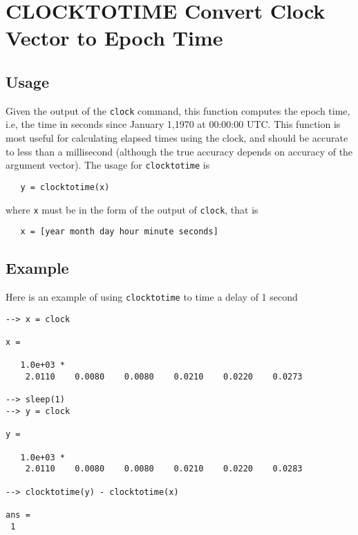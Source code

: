 \section{CLOCKTOTIME Convert Clock Vector to Epoch Time}

\subsection{Usage}

Given the output of the \verb|clock| command, this function computes
the epoch time, i.e, the time in seconds since January 1,1970 
at 00:00:00 UTC.  This function is most useful for calculating elapsed
times using the clock, and should be accurate to less than a millisecond
(although the true accuracy depends on accuracy of the argument vector). 
The usage for \verb|clocktotime| is
\begin{verbatim}
   y = clocktotime(x)
\end{verbatim}
where \verb|x| must be in the form of the output of \verb|clock|, that is
\begin{verbatim}
   x = [year month day hour minute seconds]
\end{verbatim}
\subsection{Example}

Here is an example of using \verb|clocktotime| to time a delay of 1 second
\begin{verbatim}
--> x = clock

x = 

   1.0e+03 * 
    2.0110    0.0080    0.0080    0.0210    0.0220    0.0273 

--> sleep(1)
--> y = clock

y = 

   1.0e+03 * 
    2.0110    0.0080    0.0080    0.0210    0.0220    0.0283 

--> clocktotime(y) - clocktotime(x)

ans = 
 1 
\end{verbatim}
